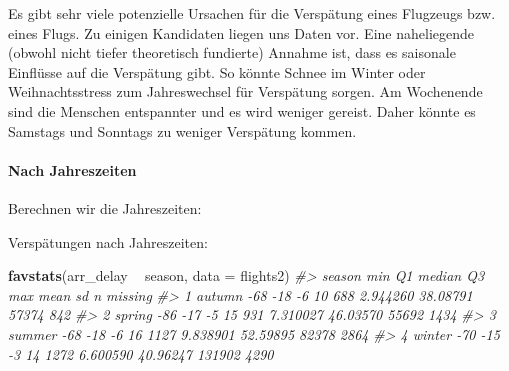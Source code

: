 \documentclass[]{article}
\newenvironment{Shaded}{\begin{snugshade}}{\end{snugshade}}
\newcommand{\CommentTok}[1]{\textcolor[rgb]{0.56,0.35,0.01}{\textit{#1}}}
\newcommand{\DataTypeTok}[1]{\textcolor[rgb]{0.13,0.29,0.53}{#1}}
\newcommand{\DecValTok}[1]{\textcolor[rgb]{0.00,0.00,0.81}{#1}}
\newcommand{\KeywordTok}[1]{\textcolor[rgb]{0.13,0.29,0.53}{\textbf{#1}}}
\newcommand{\NormalTok}[1]{#1}
\newcommand{\OperatorTok}[1]{\textcolor[rgb]{0.81,0.36,0.00}{\textbf{#1}}}
\newcommand{\OtherTok}[1]{\textcolor[rgb]{0.56,0.35,0.01}{#1}}
\newcommand{\StringTok}[1]{\textcolor[rgb]{0.31,0.60,0.02}{#1}}
\let\oldparagraph\paragraph
\renewcommand{\paragraph}[1]{\oldparagraph{#1}\mbox{}}
\begin{document}
Es gibt sehr viele potenzielle Ursachen für die Verspätung eines
Flugzeugs bzw. eines Flugs. Zu einigen Kandidaten liegen uns Daten vor.
Eine naheliegende (obwohl nicht tiefer theoretisch fundierte) Annahme
ist, dass es saisonale Einflüsse auf die Verspätung gibt. So könnte
Schnee im Winter oder Weihnachtsstress zum Jahreswechsel für Verspätung
sorgen. Am Wochenende sind die Menschen entspannter und es wird weniger
gereist. Daher könnte es Samstags und Sonntags zu weniger Verspätung
kommen.

\hypertarget{nach-jahreszeiten}{%
\paragraph{Nach Jahreszeiten}\label{nach-jahreszeiten}}

Berechnen wir die Jahreszeiten:

\begin{Shaded}
\end{Shaded}

Verspätungen nach Jahreszeiten:

\begin{Shaded}
\begin{Highlighting}[]
\KeywordTok{favstats}\NormalTok{(arr_delay }\OperatorTok{~}\StringTok{ }\NormalTok{season, }\DataTypeTok{data =}\NormalTok{ flights2)}
\CommentTok{#>   season min  Q1 median Q3  max     mean       sd      n missing}
\CommentTok{#> 1 autumn -68 -18     -6 10  688 2.944260 38.08791  57374     842}
\CommentTok{#> 2 spring -86 -17     -5 15  931 7.310027 46.03570  55692    1434}
\CommentTok{#> 3 summer -68 -18     -6 16 1127 9.838901 52.59895  82378    2864}
\CommentTok{#> 4 winter -70 -15     -3 14 1272 6.600590 40.96247 131902    4290}
\end{Highlighting}
\end{Shaded}
\end{document}
